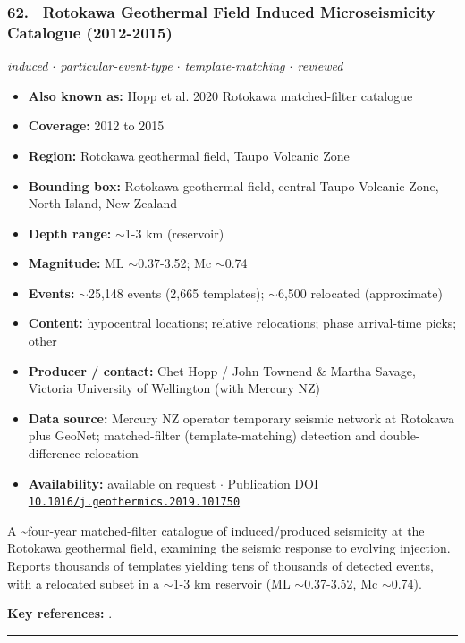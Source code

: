 \documentclass[10pt,a4paper]{article}
\newcommand{\catentryrule}{\par\vspace{3pt}\noindent\textcolor{rulegrey}{\rule{\linewidth}{0.3pt}}\par\vspace{5pt}}
\newcommand{\kv}[2]{\item \textbf{#1:} #2}
\begin{document}
\subsubsection*{\hypertarget{c:62}{62.}~ Rotokawa Geothermal Field Induced Microseismicity Catalogue (2012-2015)}
{\small\itshape induced $\cdot$ particular-event-type $\cdot$ template-matching $\cdot$ reviewed}\par\vspace{2pt}
\begin{itemize}[leftmargin=1.3em,itemsep=0.6pt,topsep=1pt,parsep=0pt]
\kv{Also known as}{Hopp et al. 2020 Rotokawa matched-filter catalogue}
\kv{Coverage}{2012 to 2015}
\kv{Region}{Rotokawa geothermal field, Taupo Volcanic Zone}
\kv{Bounding box}{Rotokawa geothermal field, central Taupo Volcanic Zone, North Island, New Zealand}
\kv{Depth range}{$\sim$1-3 km (reservoir)}
\kv{Magnitude}{ML $\sim$0.37-3.52; Mc $\sim$0.74}
\kv{Events}{$\sim$25,148 events (2,665 templates); $\sim$6,500 relocated (approximate)}
\kv{Content}{hypocentral locations; relative relocations; phase arrival-time picks; other}
\kv{Producer / contact}{Chet Hopp / John Townend \& Martha Savage, Victoria University of Wellington (with Mercury NZ)}
\kv{Data source}{Mercury NZ operator temporary seismic network at Rotokawa plus GeoNet; matched-filter (template-matching) detection and double-difference relocation}
\kv{Availability}{available on request $\cdot$ Publication DOI \href{https://doi.org/10.1016/j.geothermics.2019.101750}{\nolinkurl{10.1016/j.geothermics.2019.101750}}}
\end{itemize}
\par\vspace{2pt}A \textasciitilde{}four-year matched-filter catalogue of induced/produced seismicity at the Rotokawa geothermal field, examining the seismic response to evolving injection. Reports thousands of templates yielding tens of thousands of detected events, with a relocated subset in a $\sim$1-3 km reservoir (ML $\sim$0.37-3.52, Mc $\sim$0.74).
\par\vspace{2pt}\textbf{Key references:} \cite{Hopp2020}.
\catentryrule
\end{document}
